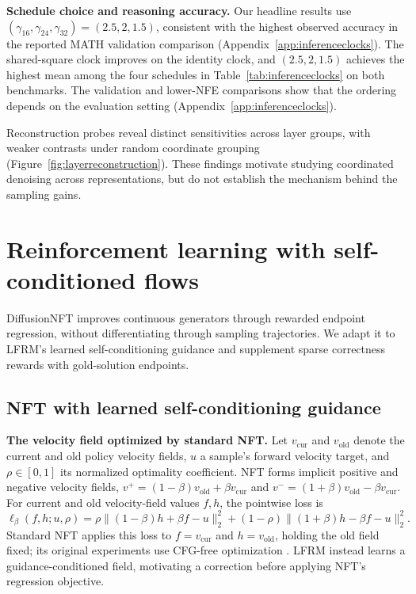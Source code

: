 \documentclass{article}
\begin{document}
\textbf{Schedule choice and reasoning accuracy.}
Our headline results use $(\gamma_{16},\gamma_{24},\gamma_{32})=(2.5,2,1.5)$, consistent with the highest observed accuracy in the reported MATH validation comparison (Appendix~\ref{app:inferenceclocks}). The shared-square clock improves on the identity clock, and $(2.5,2,1.5)$ achieves the highest mean among the four schedules in Table~\ref{tab:inferenceclocks} on both benchmarks. The validation and lower-NFE comparisons show that the ordering depends on the evaluation setting (Appendix~\ref{app:inferenceclocks}).

Reconstruction probes reveal distinct sensitivities across layer groups, with weaker contrasts under random coordinate grouping (Figure~\ref{fig:layerreconstruction}). These findings motivate studying coordinated denoising across representations, but do not establish the mechanism behind the sampling gains.


\section{Reinforcement learning with self-conditioned flows}
\label{sec:nft}

DiffusionNFT \citep{diffusionnft} improves continuous generators through rewarded endpoint regression, without differentiating through sampling trajectories. We adapt it to LFRM's learned self-conditioning guidance and supplement sparse correctness rewards with gold-solution endpoints.

\subsection{NFT with learned self-conditioning guidance}
\label{sec:nftsccfg}

\textbf{The velocity field optimized by standard NFT.}
Let $v_{\mathrm{cur}}$ and $v_{\mathrm{old}}$ denote the current and old policy velocity fields, $u$ a sample's forward velocity target, and $\rho\in[0,1]$ its normalized optimality coefficient. NFT forms implicit positive and negative velocity fields, $v^+=(1-\beta)v_{\mathrm{old}}+\beta v_{\mathrm{cur}}$ and $v^-=(1+\beta)v_{\mathrm{old}}-\beta v_{\mathrm{cur}}$. For current and old velocity-field values $f,h$, the pointwise loss is
\begin{equation}
 \ell_\beta(f,h;u,\rho)
 =\rho\|(1-\beta)h+\beta f-u\|_2^2
 +(1-\rho)\|(1+\beta)h-\beta f-u\|_2^2.
\label{eq:nftquadratic}
\end{equation}
Standard NFT applies this loss to $f=v_{\mathrm{cur}}$ and $h=v_{\mathrm{old}}$, holding the old field fixed; its original experiments use CFG-free optimization \citep{diffusionnft}. LFRM instead learns a guidance-conditioned field, motivating a correction before applying NFT's regression objective.
\end{document}
